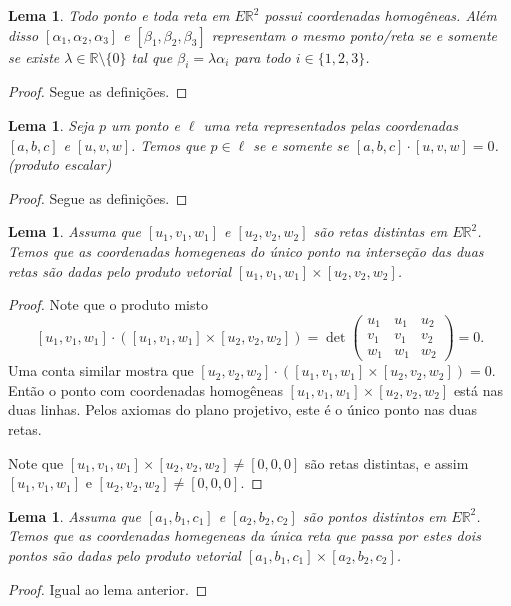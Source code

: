\documentclass[12pt]{amsart}
\newcommand{\R}{\mathbb R}
\newtheorem{lemma}[theorem]{Lema}
\theoremstyle{definition}
\begin{document}
\begin{lemma}
    Todo ponto e toda reta em $E\R^2$ possui coordenadas homogêneas. Além disso 
    $[\alpha_1,\alpha_2,\alpha_3]$ e $[\beta_1,\beta_2,\beta_3]$ representam o mesmo ponto/reta se e somente 
    se existe $\lambda\in\R\setminus\{0\}$ tal que $\beta_i=\lambda\alpha_i$ para todo $i\in\{1,2,3\}$.  
\end{lemma}
\begin{proof}
    Segue as definições.
\end{proof}

\begin{lemma}
    Seja $p$ um ponto e $\ell$ uma reta representados pelas coordenadas $[a,b,c]$ e $[u,v,w]$. Temos que 
    $p\in\ell$ se e somente se $[a,b,c]\cdot [u,v,w]=0$. (produto escalar)
\end{lemma}
\begin{proof}
    Segue as definições.
\end{proof}

\begin{lemma}
    Assuma que $[u_1,v_1,w_1]$ e $[u_2,v_2,w_2]$ são retas distintas em $E\R^2$. Temos que 
    as coordenadas homegeneas do único ponto na interseção das duas retas são 
    dadas pelo produto vetorial
    $[u_1,v_1,w_1]\times [u_2,v_2,w_2]$. 
\end{lemma}
\begin{proof}
    Note que o produto misto 
    \[
        [u_1,v_1,w_1]\cdot([u_1,v_1,w_1]\times [u_2,v_2,w_2])=\det\begin{pmatrix}
            u_1 & u_1 & u_2\\ v_1 & v_1 & v_2\\w_1 & w_1 & w_2\end{pmatrix}=0. 
    \]
    Uma conta similar mostra que $[u_2,v_2,w_2]\cdot([u_1,v_1,w_1]\times [u_2,v_2,w_2])=0$. 
    Então o ponto com coordenadas homogêneas $[u_1,v_1,w_1]\times [u_2,v_2,w_2]$ está nas duas linhas. 
    Pelos axiomas do plano projetivo, este é o único ponto nas duas retas. 

    Note que $[u_1,v_1,w_1]\times [u_2,v_2,w_2]\neq [0,0,0]$ são retas distintas, e assim 
    $[u_1,v_1,w_1]$ e $[u_2,v_2,w_2]\neq [0,0,0]$. 
\end{proof}

\begin{lemma}
    Assuma que $[a_1,b_1,c_1]$ e $[a_2,b_2,c_2]$ são pontos distintos em $E\R^2$. Temos que 
    as coordenadas homegeneas da única reta que passa por estes dois pontos  são 
    dadas pelo produto vetorial
    $[a_1,b_1,c_1]\times [a_2,b_2,c_2]$. 
\end{lemma}
\begin{proof}
    Igual ao lema anterior.
\end{proof}
\end{document}

